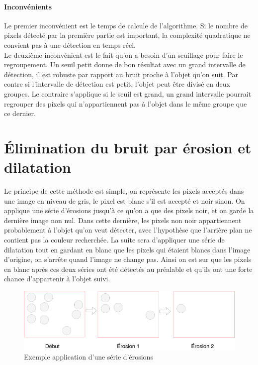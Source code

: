 \documentclass[12pt]{report}
\begin{document}
\paragraph{Inconvénients}

Le premier inconvénient est le temps de calcule de l’algorithme. Si le nombre de pixels détecté par la première partie est important, la complexité quadratique ne convient pas à une détection en temps réel.\\

Le deuxième inconvénient est le fait qu’on a besoin d’un seuillage pour faire le regroupement. Un seuil petit donne de bon résultat avec un grand intervalle de détection, il est robuste par rapport au bruit proche à l’objet qu’on suit. Par contre si l’intervalle de détection est petit, l’objet peut être divisé en deux groupes. Le contraire s’applique si le seuil est grand, un grand intervalle pourrait regrouper des pixels qui n’appartiennent pas à l’objet dans le même groupe que ce dernier.
\section{Élimination du bruit par érosion et dilatation}
Le principe de cette méthode est simple, on représente les pixels acceptés dans une image en niveau de gris, le pixel est blanc s’il est accepté et noir sinon. On applique une série d’érosions jusqu’à ce qu’on a que des pixels noir, et on garde la dernière image non nul. Dans cette dernière, les pixels non noir appartiennent probablement à l’objet qu’on veut détecter, avec l’hypothèse que l’arrière plan ne contient pas la couleur recherchée. La suite sera d’appliquer une série de dilatation tout en gardant en blanc que les pixels qui étaient blancs dans l’image d’origine, on s’arrête quand l’image ne change pas. Ainsi on est sur que les pixels en blanc après ces deux séries ont été détectés au préalable et qu’ils ont une forte chance d’appartenir à l’objet suivi.
\begin{figure}[H]
	\centering
	\includegraphics[scale=0.75]{imgs/erosions1.png}
	\caption{Exemple application d'une série d'érosions}
	\label{fig:Erosions}
\end{figure}
\end{document}
